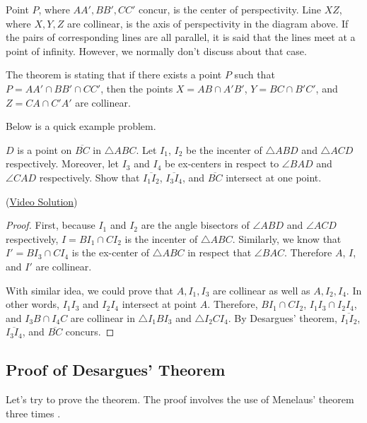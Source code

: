 \documentclass[../../main.tex]{subfiles}
\begin{document}
Point $P$, where $AA', BB', CC'$ concur, is the center of
perspectivity. Line $XZ$, where $X, Y, Z$ are collinear, is the axis
of perspectivity in the diagram above. If the pairs of corresponding
lines are all parallel, it is said that the lines meet at a point of
infinity. However, we normally don't discuss about that case.

The theorem is stating that if there exists a point $P$ such that
$P = AA' \cap BB' \cap CC'$, then the points $X = AB \cap A'B'$,
$Y = BC \cap B'C'$, and $Z = CA \cap C'A'$ are collinear.

Below is a quick example problem.

\begin{problem}{}{}
$D$ is a point on $\overline{BC}$ in $\triangle{ABC}$. Let $I_1$,
$I_2$ be the incenter of $\triangle{ABD}$ and $\triangle{ACD}$
respectively. Moreover, let $I_3$ and $I_4$ be ex-centers in
respect to $\angle{BAD}$ and $\angle{CAD}$ respectively. Show that
$\overline{I_1 I_2}$, $\overline{I_3 I_4}$, and $\overline{BC}$
intersect at one point.
\end{problem}
(\href{https://www.youtube.com/watch?v=adwiSgEAIG0}{Video Solution})
\begin{proof}
First, because $I_1$ and $I_2$ are the angle bisectors of
$\angle{ABD}$ and $\angle{ACD}$ respectively, $I = BI_1 \cap CI_2$
is the incenter of $\triangle{ABC}$. Similarly, we know that $I' =
BI_3 \cap CI_4$ is the ex-center of $\triangle{ABC}$ in respect that
$\angle{BAC}$. Therefore $A$, $I$, and $I'$ are collinear.

With similar idea, we could prove that $A, I_1, I_3$ are collinear
as well as $A, I_2, I_4$. In other words, $I_1I_3$ and $I_2I_4$
intersect at point $A$. Therefore, $BI_1 \cap CI_2$, $I_1I_3 \cap
I_2I_4$, and $I_3B \cap I_4C$ are collinear in $\triangle{I_1BI_3}$
and $\triangle{I_2CI_4}$. By Desargues' theorem, $\overline{I_1 I_2}$,
$\overline{I_3 I_4}$, and $\overline{BC}$ concurs.
\end{proof}

\subsection{Proof of Desargues' Theorem}

Let's try to prove the theorem. The proof involves the use of
Menelaus' theorem three times \cite{MATH01-1}.
\end{document}
